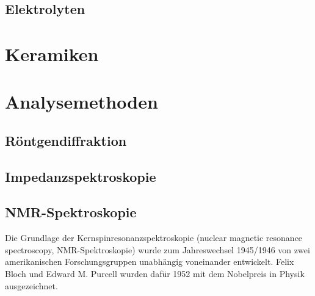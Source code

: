 \documentclass[a4paper, 11pt, headsepline,footsepline,twoside,abstract]{scrbook}
\begin{document}
\subsection{Elektrolyten}
\section{Keramiken}
\section{Analysemethoden}
\subsection{Röntgendiffraktion}
\subsection{Impedanzspektroskopie}
\subsection{NMR-Spektroskopie}
Die Grundlage der Kernspinresonanzspektroskopie (nuclear magnetic resonance spectroscopy, NMR-Spektroskopie) wurde zum Jahreswechsel 1945/1946 von zwei amerikanischen Forschungsgruppen unabhängig voneinander entwickelt. Felix Bloch und Edward M. Purcell wurden dafür 1952 mit dem Nobelpreis in Physik ausgezeichnet.
\\\\
\end{document}
